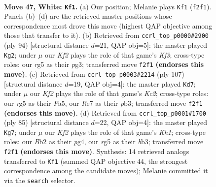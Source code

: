 \documentclass[11pt]{article}
\begin{document}
\clearpage

\begin{figure}[p]\centering
\begin{subfigure}{0.46\textwidth}\centering
\resizebox{\linewidth}{!}{%
\newchessgame
\chessboard[
  setfen={7k/4R3/8/pp4r1/b1p5/P1P5/1B3K2/8 w - - 0 47},
  showmover=false,
  pgfstyle=straightmove, color=movearrow, markmove={f2-f1}
]}
\caption{}
\end{subfigure}\hfill
\begin{subfigure}{0.46\textwidth}\centering
\resizebox{\linewidth}{!}{%
\newchessgame
\chessboard[
  setfen={8/3B4/1p6/p1b3k1/P7/2P2Kp1/1P6/8 w - - 0 48},
  showmover=false,
  pgfstyle=straightmove, color=movearrow, markmove={f3-g2}
]}
\caption{}
\end{subfigure}
\\[4pt]
\begin{subfigure}{0.46\textwidth}\centering
\resizebox{\linewidth}{!}{%
\newchessgame
\chessboard[
  setfen={8/2k5/3p1p2/p2B1P1K/4P3/1P6/P2b4/8 b - - 2 54},
  showmover=false,
  pgfstyle=straightmove, color=movearrow, markmove={c7-d7}
]}
\caption{}
\end{subfigure}\hfill
\begin{subfigure}{0.46\textwidth}\centering
\resizebox{\linewidth}{!}{%
\newchessgame
\chessboard[
  setfen={7k/8/7p/p5bP/1p2K1P1/1B6/P5P1/8 b - - 4 43},
  showmover=false,
  pgfstyle=straightmove, color=movearrow, markmove={h8-g7}
]}
\caption{}
\end{subfigure}
\caption{\textbf{Move 47, White: \texttt{Kf1}.} (a) Our position; Melanie plays \texttt{Kf1} (\texttt{f2f1}). Panels (b)--(d) are the retrieved master positions whose correspondence most drove this move (highest QAP objective among those that transfer to it). (b) Retrieved from \texttt{ccrl\_top\_p0000\#2900} (ply 94) [structural distance $d$=21, QAP obj=5]: the master played \texttt{Kg2}; under $\mu$ our \emph{Kf2} plays the role of that game's \emph{Kf3}; cross-type roles: our \emph{r}g5 as their \emph{p}g3; transferred move \texttt{f2f1} \textbf{(endorses this move)}. (c) Retrieved from \texttt{ccrl\_top\_p0003\#2214} (ply 107) [structural distance $d$=19, QAP obj=4]: the master played \texttt{Kd7}; under $\mu$ our \emph{Kf2} plays the role of that game's \emph{Kc2}; cross-type roles: our \emph{r}g5 as their \emph{P}a5, our \emph{R}e7 as their \emph{p}b3; transferred move \texttt{f2f1} \textbf{(endorses this move)}. (d) Retrieved from \texttt{ccrl\_top\_p0001\#1700} (ply 85) [structural distance $d$=22, QAP obj=4]: the master played \texttt{Kg7}; under $\mu$ our \emph{Kf2} plays the role of that game's \emph{Kh1}; cross-type roles: our \emph{B}b2 as their \emph{p}g4, our \emph{r}g5 as their \emph{b}b3; transferred move \texttt{f2f1} \textbf{(endorses this move)}. Synthesis: 14 retrieved analogs transferred to \texttt{Kf1} (summed QAP objective 44, the strongest correspondence among the candidate moves); Melanie committed it via the \texttt{search} selector.}
\label{fig:thought-m92}
\end{figure}
\end{document}
